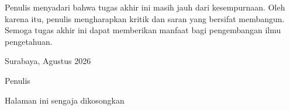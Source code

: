 \indent Penulis menyadari bahwa tugas akhir ini masih jauh dari kesempurnaan. Oleh karena itu, penulis mengharapkan kritik dan saran yang bersifat membangun. Semoga tugas akhir ini dapat memberikan manfaat bagi pengembangan ilmu pengetahuan.

\vspace{1cm}
\begin{flushright}
	Surabaya, Agustus 2026
	
	Penulis
\end{flushright}

\newpage
\thispagestyle{empty}
\vspace*{\fill}
	\begin{center}
		Halaman ini sengaja dikosongkan
	\end{center}
\vspace*{\fill}
\pagebreak
